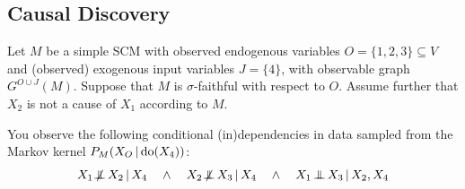 \subsection{Causal Discovery}

Let $M$ be a simple SCM with observed endogenous variables $O = \{1,2,3\} \subseteq V$ and (observed) exogenous input variables $J = \{4\}$, with observable graph $G^{O\cup J}(M)$.
Suppose that $M$ is $\sigma$-faithful with respect to $O$.
Assume further that $X_2$ is not a cause of $X_1$ according to $M$.

You observe the following conditional (in)dependencies in data sampled from the Markov kernel $P_M(X_O \operatorname*{|} \operatorname{do}(X_4))$:
  $$X_1 \nIndep X_2 \given X_4 \quad \land \quad X_2 \nIndep X_3 \given X_4 \quad \land \quad X_1 \Indep X_3 \given X_2,X_4$$

